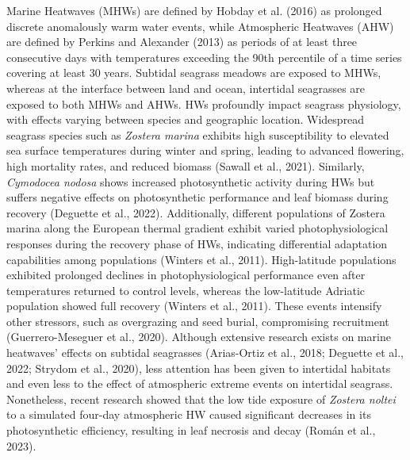 \documentclass[
  letterpaper,
  DIV=11,
  numbers=noendperiod]{scrartcl}
\begin{document}
Marine Heatwaves (MHWs) are defined by Hobday et al. (2016) as prolonged
discrete anomalously warm water events, while Atmospheric Heatwaves
(AHW) are defined by Perkins and Alexander (2013) as periods of at least
three consecutive days with temperatures exceeding the 90th percentile
of a time series covering at least 30 years. Subtidal seagrass meadows
are exposed to MHWs, whereas at the interface between land and ocean,
intertidal seagrasses are exposed to both MHWs and AHWs. HWs profoundly
impact seagrass physiology, with effects varying between species and
geographic location. Widespread seagrass species such as \emph{Zostera
marina} exhibits high susceptibility to elevated sea surface
temperatures during winter and spring, leading to advanced flowering,
high mortality rates, and reduced biomass (Sawall et al., 2021).
Similarly, \emph{Cymodocea nodosa} shows increased photosynthetic
activity during HWs but suffers negative effects on photosynthetic
performance and leaf biomass during recovery (Deguette et al., 2022).
Additionally, different populations of Zostera marina along the European
thermal gradient exhibit varied photophysiological responses during the
recovery phase of HWs, indicating differential adaptation capabilities
among populations (Winters et al., 2011). High-latitude populations
exhibited prolonged declines in photophysiological performance even
after temperatures returned to control levels, whereas the low-latitude
Adriatic population showed full recovery (Winters et al., 2011). These
events intensify other stressors, such as overgrazing and seed burial,
compromising recruitment (Guerrero-Meseguer et al., 2020). Although
extensive research exists on marine heatwaves' effects on subtidal
seagrasses (Arias-Ortiz et al., 2018; Deguette et al., 2022; Strydom et
al., 2020), less attention has been given to intertidal habitats and
even less to the effect of atmospheric extreme events on intertidal
seagrass. Nonetheless, recent research showed that the low tide exposure
of \emph{Zostera noltei} to a simulated four-day atmospheric HW caused
significant decreases in its photosynthetic efficiency, resulting in
leaf necrosis and decay (Román et al., 2023).
\end{document}
